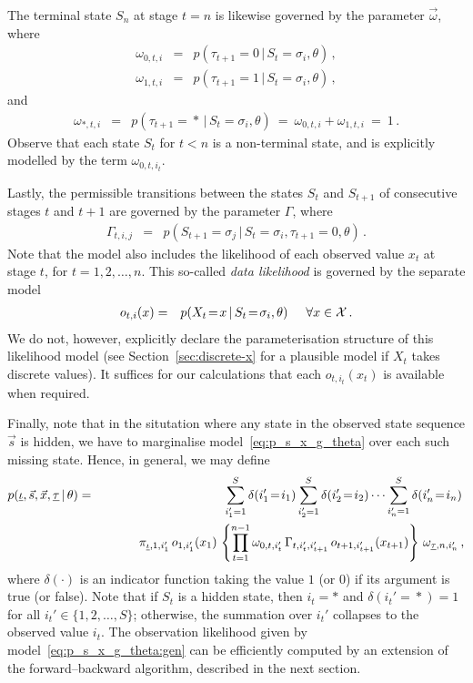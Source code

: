 \documentclass[a4paper]{article}
\newcommand{\ui}{\underline{\iota}}
\newcommand{\ut}{\underline{\tau}}
\begin{document}
The terminal state $S_n$ at stage $t=n$ is likewise governed by the parameter $\vec{\omega}$, where
\begin{eqnarray}
  \omega_{0,t,i} & = & p(\tau_{t+1}\!=\!0\,|\,S_t\!=\!\sigma_{i},\theta)\,,
\\
  \omega_{1,t,i} & = & p(\tau_{t+1}\!=\!1\,|\,S_t\!=\!\sigma_{i},\theta)\,,
\end{eqnarray}
and
\begin{eqnarray}
  \omega_{*,t,i} & = & p(\tau_{t+1}\!=\!*\,|\,S_t\!=\!\sigma_{i},\theta)
~=~\omega_{0,t,i}+\omega_{1,t,i}~=~1\,.
\end{eqnarray}
Observe that each state $S_t$ for $t<n$ is a non-terminal state, and is explicitly modelled by the term
$\omega_{0,t,i_t}$.

Lastly, the permissible transitions between the states $S_t$ and $S_{t+1}$ of consecutive stages $t$ and $t+1$ are governed by
the parameter $\Gamma$, where
\begin{eqnarray}
  \Gamma_{t,i,j} & = & p(S_{t+1}\!=\!\sigma_{j}\,|\,S_t\!=\!\sigma_{i},\tau_{t+1}\!=\!0,\theta)\,.
\end{eqnarray}
Note that the model also includes the likelihood of each observed value $x_t$ at stage $t$, for $t=1,2,\ldots,n$.
This so-called {\em data likelihood} is governed by the separate model
\begin{eqnarray}
  o_{t,i}(x) & = & p(X_t\!=\!x\,|\,S_t\!=\!\sigma_{i},\theta) \hspace*{5mm}\forall x\in{\cal X}\,.
\end{eqnarray}
We do not, however, explicitly declare the parameterisation structure of this likelihood model (see Section~\ref{sec:discrete-x} for a plausible model if $X_t$ takes discrete values). 
It suffices for our calculations that each $o_{t,i_t}(x_t)$ is available when required.

Finally, note that in the situtation where any state in the observed state sequence $\vec{s}$ is hidden, we have to marginalise model~\eqref{eq:p_s_x_g_theta} over each such missing state. Hence, in general, we may define
\begin{eqnarray}
   p(\ui,\vec{s},\vec{x},\ut\,|\,\theta) 
& = & 
   \sum_{i_1'=1}^{S}\delta(i_1'\!=\!i_1)\sum_{i_2'=1}^{S}\delta(i_2'\!=\!i_2)\cdots\sum_{i_n'=1}^{S}\delta(i_n'\!=\!i_n)\,
\nonumber\\&&\hspace*{10mm}\pi_{\ui,1,i_1'}\,o_{1,i_1'}(x_1)\,
\left\{\prod_{t=1}^{n-1}\omega_{0,t,i_t'}\,\Gamma_{t,i_t',i_{t+1}'}\,o_{t+1,i_{t+1}'}(x_{t+1})
\right\}\,\omega_{\ut,n,i_n'}
\,,
\label{eq:p_s_x_g_theta:gen}
\end{eqnarray}
where $\delta(\cdot)$ is an indicator function taking the value $1$ (or $0$) if its argument is true (or false).
Note that if $S_t$ is a hidden state, then $i_t=*$ and $\delta(i_t'\!=\!*)=1$ for all $i_t'\in\{1,2,\ldots,S\}$; otherwise, the summation over $i_t'$ collapses to the observed value $i_t$.
The observation likelihood given by model~\eqref{eq:p_s_x_g_theta:gen} can be efficiently computed by an
extension of the forward--backward algorithm, described in the next section.
\end{document}
